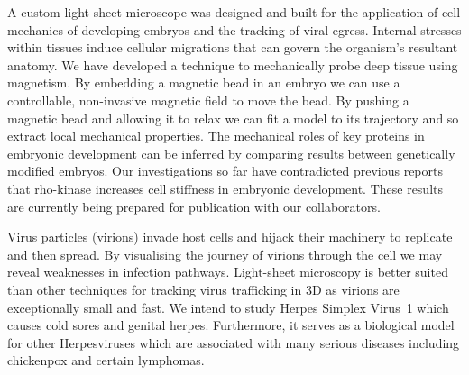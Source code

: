 A custom light-sheet microscope was designed and built  for the application of cell mechanics of developing embryos and the tracking of viral egress.
Internal stresses within tissues induce cellular migrations that can govern the organism's resultant anatomy.
We have developed a technique to mechanically probe deep tissue using magnetism.
By embedding a magnetic bead in an embryo we can use a controllable, non-invasive magnetic field to move the bead.
By pushing a magnetic bead and allowing it to relax we can fit a model to its trajectory and so extract local mechanical properties.
The mechanical roles of key proteins in embryonic development can be inferred by comparing results between genetically modified embryos.
Our investigations so far have contradicted previous reports that rho-kinase increases cell stiffness in embryonic development. These results are currently being prepared for publication with our collaborators.

Virus particles (virions) invade host cells and hijack their machinery to replicate and then spread. %
By visualising the journey of virions through the cell we may reveal weaknesses in infection pathways.
Light-sheet microscopy is better suited than other techniques for tracking virus trafficking in 3D as virions are exceptionally small and fast.
We intend to study Herpes Simplex Virus~1 which causes cold sores and genital herpes.
Furthermore, it serves as a biological model for other Herpesviruses which are associated with many serious diseases including chickenpox and certain lymphomas.

